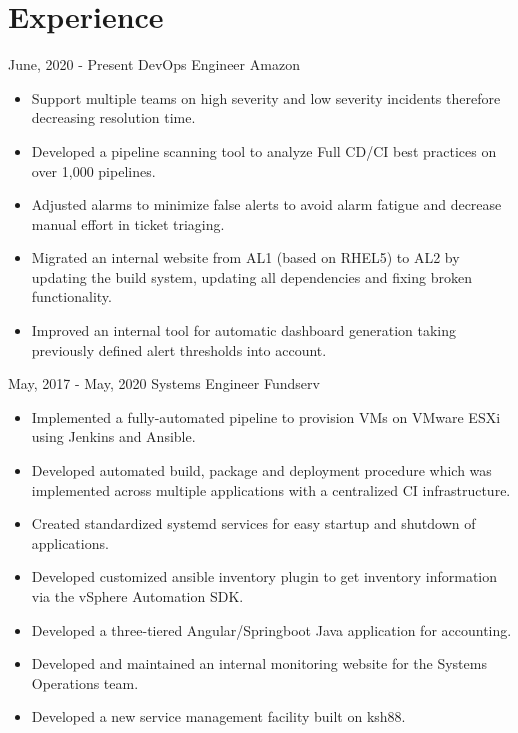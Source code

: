\documentclass[]{friggeri-cv}
\begin{document}
\section{Experience}
\begin{entrylist}
  \entry
    {June, 2020 - Present}
    {DevOps Engineer}
    {Amazon}
    {\begin{itemize}
        \item Support multiple teams on high severity and low severity incidents therefore decreasing resolution time.
        \item Developed a pipeline scanning tool to analyze Full CD/CI best practices on over 1,000 pipelines.
        \item Adjusted alarms to minimize false alerts to avoid alarm fatigue and decrease manual effort in ticket triaging.
        \item Migrated an internal website from AL1 (based on RHEL5) to AL2 by updating the build system, updating all dependencies and fixing broken functionality.
        \item Improved an internal tool for automatic dashboard generation taking previously defined alert thresholds into account.
    \end{itemize}}
  \entry
    {May, 2017 - May, 2020}
    {Systems Engineer}
    {Fundserv}
    {\begin{itemize}
        \item Implemented a fully-automated pipeline to provision VMs on VMware ESXi using Jenkins and Ansible.
        \item Developed automated build, package and deployment procedure which was implemented across multiple applications with a centralized CI infrastructure.
        \item Created standardized systemd services for easy startup and shutdown of\\applications.
        \item Developed customized ansible inventory plugin to get inventory information via the vSphere Automation SDK.
        \item Developed a three-tiered Angular/Springboot Java application for accounting.
        \item Developed and maintained an internal monitoring website for the Systems\\Operations team.
        \item Developed a new service management facility built on ksh88.
    \end{itemize}}
\end{entrylist}
\end{document}
